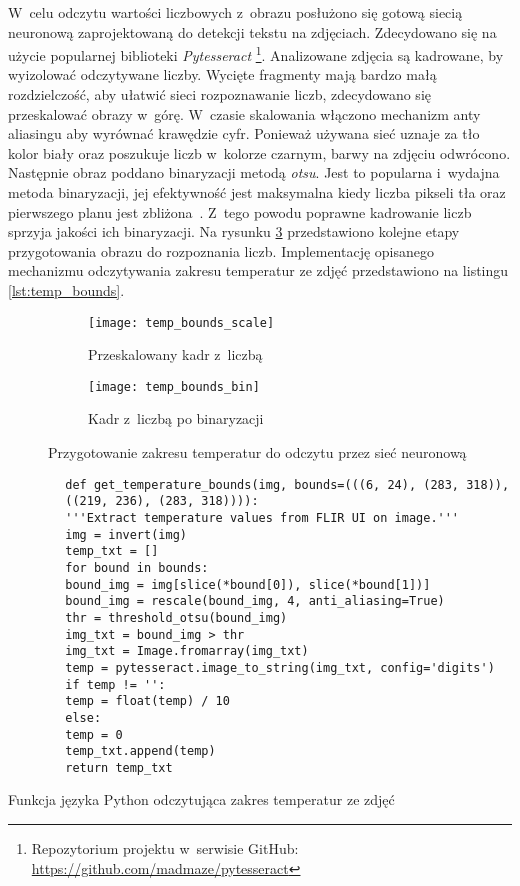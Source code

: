 W~celu odczytu wartości liczbowych z~obrazu posłużono się gotową siecią
neuronową zaprojektowaną do detekcji tekstu na zdjęciach.
Zdecydowano się na użycie popularnej biblioteki \emph{Pytesseract}
\footnote{Repozytorium projektu w~serwisie GitHub:
	\url{https://github.com/madmaze/pytesseract}}.
Analizowane zdjęcia są kadrowane, by wyizolować odczytywane liczby.
Wycięte fragmenty mają bardzo małą rozdzielczość, aby ułatwić sieci
rozpoznawanie liczb, zdecydowano się przeskalować obrazy w~górę.
W~czasie skalowania włączono mechanizm anty aliasingu aby wyrównać krawędzie
cyfr.
Ponieważ używana sieć uznaje za tło kolor biały oraz poszukuje liczb w~kolorze
czarnym, barwy na zdjęciu odwrócono.
Następnie obraz poddano binaryzacji metodą \emph{otsu}.
Jest to popularna i~wydajna metoda binaryzacji, jej efektywność jest
maksymalna kiedy liczba pikseli tła oraz pierwszego planu jest
zbliżona~\cite{sezgin_thresholding}.
Z~tego powodu poprawne kadrowanie liczb sprzyja jakości ich binaryzacji.
Na rysunku \ref{fig:temp_bounds} przedstawiono kolejne etapy przygotowania
obrazu do rozpoznania liczb.
Implementację opisanego mechanizmu odczytywania zakresu temperatur ze zdjęć
przedstawiono na listingu \ref{lst:temp_bounds}.
\begin{figure}[htbp]
	\centering
	\begin{subfigure}{0.45\textwidth}
		\centering
		\texttt{[image: temp\_bounds\_scale]}
		\caption{Przeskalowany kadr z~liczbą}
		\label{fig:temp_bounds_scale}
	\end{subfigure}
	\hspace{0.5cm}
	\begin{subfigure}{0.45\textwidth}
		\centering
		\texttt{[image: temp\_bounds\_bin]}
		\caption{Kadr z~liczbą po binaryzacji}
		\label{fig:temp_bounds_bin}
	\end{subfigure}
	\caption{Przygotowanie zakresu temperatur do odczytu przez sieć neuronową}
	\label{fig:temp_bounds}
\end{figure}

\begin{listing}[htbp]
	\begin{verbatim}
		def get_temperature_bounds(img, bounds=(((6, 24), (283, 318)),
		((219, 236), (283, 318)))):
		'''Extract temperature values from FLIR UI on image.'''
		img = invert(img)
		temp_txt = []
		for bound in bounds:
		bound_img = img[slice(*bound[0]), slice(*bound[1])]
		bound_img = rescale(bound_img, 4, anti_aliasing=True)
		thr = threshold_otsu(bound_img)
		img_txt = bound_img > thr
		img_txt = Image.fromarray(img_txt)
		temp = pytesseract.image_to_string(img_txt, config='digits')
		if temp != '':
		temp = float(temp) / 10
		else:
		temp = 0
		temp_txt.append(temp)
		return temp_txt
	\end{verbatim}
	\caption{Funkcja języka Python odczytująca zakres temperatur ze zdjęć}
	\label{lst:temp_bounds}
\end{listing}

